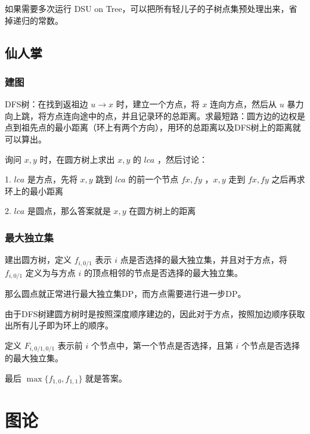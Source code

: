 \vspace{0.2cm}

如果需要多次运行 DSU on Tree，可以把所有轻儿子的子树点集预处理出来，省掉递归的常数。



\newpage

\subsection{仙人掌}

\subsubsection{建图}

DFS树：在找到返祖边 $u\to x$ 时，建立一个方点，将 $x$ 连向方点，然后从 $u$ 暴力向上跳，将方点连向途中的点，并且记录环的总距离。求最短路：圆方边的边权是点到祖先点的最小距离（环上有两个方向），用环的总距离以及DFS树上的距离就可以算出。

询问 $x,y$ 时，在圆方树上求出 $x,y$ 的 $lca$ ，然后讨论：

1. $lca$ 是方点，先将 $x,y$ 跳到 $lca$ 的前一个节点 $fx,fy$ ，$x,y$ 走到 $fx,fy$ 之后再求环上的最小距离

2. $lca$ 是圆点，那么答案就是 $x,y$ 在圆方树上的距离



\newpage

\subsubsection{最大独立集}

建出圆方树，定义 $f_{i,0/1}$ 表示 $i$ 点是否选择的最大独立集，并且对于方点，将 $f_{i,0/1}$ 定义为与方点 $i$ 的顶点相邻的节点是否选择的最大独立集。

那么圆点就正常进行最大独立集DP，而方点需要进行进一步DP。

由于DFS树建圆方树时是按照深度顺序建边的，因此对于方点，按照加边顺序获取出所有儿子即为环上的顺序。

定义 $F_{i,0/1,0/1}$ 表示前 $i$ 个节点中，第一个节点是否选择，且第 $i$ 个节点是否选择的最大独立集。

最后 $\max\{f_{1,0},f_{1,1}\}$ 就是答案。



\newpage

\section{图论}

